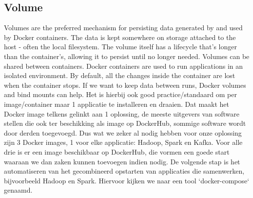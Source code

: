 \subsection{Volume}
Volumes are the preferred mechanism for persisting data generated by and used by Docker containers.
The data is kept somewhere on storage attached to the host - often the local filesystem. The volume itself has a lifecycle that's longer than the container's, allowing it to persist until no longer needed. Volumes can be shared between containers. \autocite{Javatpoint2023}
\newline
\newline
Docker containers are used to run applications in an isolated environment. By default, all the changes inside the container are lost when the container stops. If we want to keep data between runs, Docker volumes and bind mounts can help. \autocite{Frieze2022}
\newline
\newline
Het is hierbij ook good practice/standaard om per image/container maar 1 applicatie te installeren en draaien. Dat maakt het Docker image telkens gelinkt aan 1 oplossing, de meeste uitgevers van software stellen die ook ter beschikking als image op DockerHub, sommige software wordt door derden toegevoegd.
\newline
\newline
Dus wat we zeker al nodig hebben voor onze oplossing zijn 3 Docker images, 1 voor elke applicatie: Hadoop, Spark en Kafka. Voor alle drie is er een image beschikbaar op DockerHub, die vormen een goede start waaraan we dan zaken kunnen toevoegen indien nodig.
\newline
\newline
De volgende stap is het automatiseren van het gecombineerd opstarten van applicaties die samenwerken, bijvoorbeeld Hadoop en Spark. Hiervoor kijken we naar een tool `docker-compose` genaamd.

